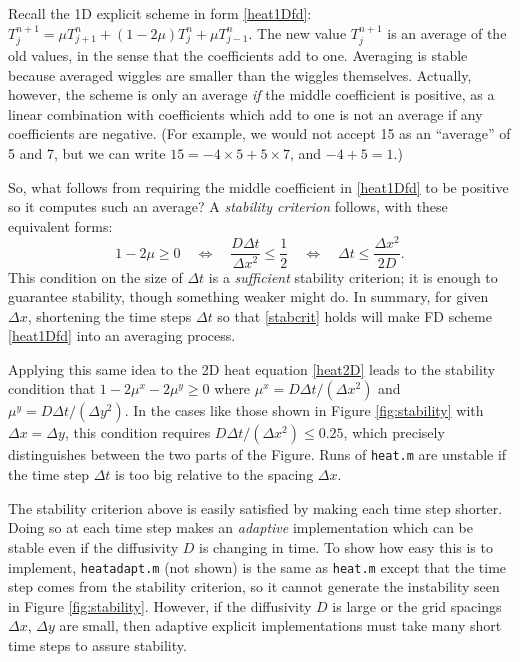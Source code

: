\documentclass[letterpaper,final,12pt,reqno]{amsart}
\begin{document}
Recall the 1D explicit scheme in form \eqref{heat1Dfd}: $T_j^{n+1} = \mu T_{j+1}^n + (1 - 2 \mu) T_j^n + \mu T_{j-1}^n$.  The new value $T_j^{n+1}$ is an average of the old values, in the sense that the coefficients add to one.  Averaging is stable because averaged wiggles are smaller than the wiggles themselves.  Actually, however, the scheme is only an average \emph{if} the middle coefficient is positive, as a linear combination with coefficients which add to one is not an average if any coefficients are negative.  (For example, we would not accept 15 as an ``average'' of 5 and 7, but we can write $15 = -4 \times 5 + 5 \times 7$, and $-4+5=1$.)

So, what follows from requiring the middle coefficient in \eqref{heat1Dfd} to be positive so it computes such an average?  A \emph{stability criterion} follows, with these equivalent forms:
\begin{equation}
   1 - 2 \mu \ge 0 \quad \iff \quad \frac{D\Delta t}{\Delta x^2} \le \frac{1}{2} \quad \iff \quad \Delta t \le \frac{\Delta x^2}{2 D}.  \label{stabcrit}
\end{equation}
This condition on the size of $\Delta t$ is a \emph{sufficient} stability criterion; it is enough to guarantee stability, though something weaker might do.  In summary, for given $\Delta x$, shortening the time steps $\Delta t$ so that \eqref{stabcrit} holds will make FD scheme \eqref{heat1Dfd} into an averaging process.

Applying this same idea to the 2D heat equation \eqref{heat2D} leads to the stability condition that $1-2\mu^x-2\mu^y \ge 0$ where $\mu^x = D \Delta t / (\Delta x^2)$ and $\mu^y = D \Delta t / (\Delta y^2)$.  In the cases like those shown in Figure \ref{fig:stability} with $\Delta x=\Delta y$, this condition requires $D \Delta t /(\Delta x^2) \le 0.25$, which precisely distinguishes between the two parts of the Figure.  Runs of \texttt{heat.m} are unstable if the time step $\Delta t$ is too big relative to the spacing $\Delta x$.

The stability criterion above is easily satisfied by making each time step shorter.  Doing so at each time step makes an \emph{adaptive} implementation which can be stable even if the diffusivity $D$ is changing in time.  To show how easy this is to implement, \texttt{heatadapt.m} (not shown) is the same as \texttt{heat.m} except that the time step comes from the stability criterion, so it cannot generate the instability seen in Figure \ref{fig:stability}.  However, if the diffusivity $D$ is large or the grid spacings $\Delta x$, $\Delta y$ are small, then adaptive explicit implementations must take many short time steps to assure stability.
\end{document}
